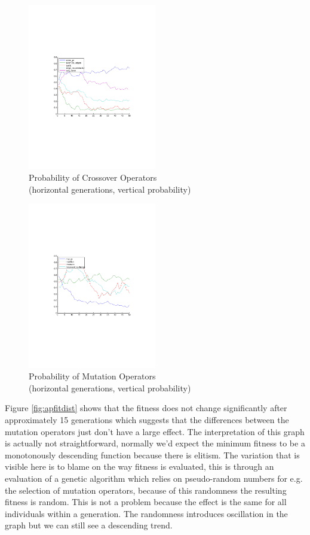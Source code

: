 \documentclass[a4paper]{article}
\begin{document}
\begin{figure}[h]
	\centering
    \includegraphics[width=0.5\textwidth,trim={4cm 8cm 4cm 8cm},clip]{apcxops}
    \captionsetup{justification=centering}
    \caption{Probability of Crossover Operators\\
    		(horizontal generations, vertical probability)}
    \label{fig:probcross}
\end{figure}
\begin{figure}[h]
	\centering
    \includegraphics[width=0.5\textwidth,trim={4cm 8cm 4cm 8cm},clip]{apmutops}
    \captionsetup{justification=centering}
    \caption{Probability of Mutation Operators\\
    		(horizontal generations, vertical probability)}
    \label{fig:probmut}
\end{figure}

Figure \ref{fig:apfitdist} shows that the fitness does not change
significantly after approximately 15 generations which suggests that
the differences between the mutation operators just don't have a large
effect.
The interpretation of this graph is actually not straightforward,
normally we'd expect the minimum fitness to be a monotonously
descending function because there is elitism.
The variation that is visible here is to blame on the way fitness is
evaluated, this is through an evaluation of a genetic algorithm which
relies on pseudo-random numbers for e.g. the selection of mutation
operators, because of this randomness the resulting fitness is random.
This is not a problem because  the effect is the same for all
individuals within a generation.
The randomness introduces oscillation in the graph but we can still
see a descending trend.
\end{document}
